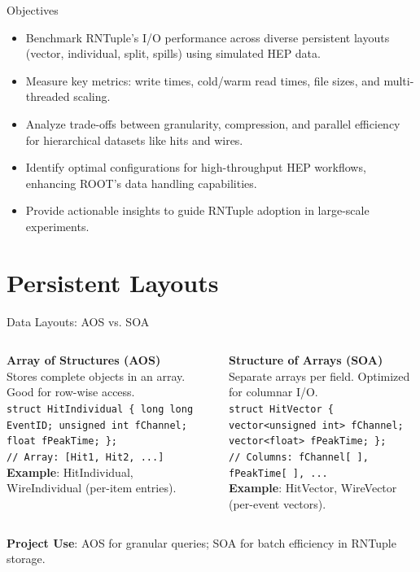 \documentclass[aspectratio=169]{beamer}
\begin{document}
\begin{frame}{Objectives}
  \begin{itemize}
    \item Benchmark RNTuple's I/O performance across diverse persistent layouts (vector, individual, split, spills) using simulated HEP data.
    \item Measure key metrics: write times, cold/warm read times, file sizes, and multi-threaded scaling.
    \item Analyze trade-offs between granularity, compression, and parallel efficiency for hierarchical datasets like hits and wires.
    \item Identify optimal configurations for high-throughput HEP workflows, enhancing ROOT's data handling capabilities.
    \item Provide actionable insights to guide RNTuple adoption in large-scale experiments.
  \end{itemize}
\end{frame}

\section{Persistent Layouts}
\begin{frame}{Data Layouts: AOS vs. SOA}
  \begin{columns}
    \textbf{Array of Structures (AOS)} \\
    \small Stores complete objects in an array. Good for row-wise access.
    \vspace{0.5em}\\
    \texttt{struct HitIndividual \{ long long EventID; unsigned int fChannel; float fPeakTime; \};} \\
    \texttt{// Array: [Hit1, Hit2, ...]}
    \vspace{0.5em}\\
    \textbf{Example}: HitIndividual, WireIndividual (per-item entries).

    \textbf{Structure of Arrays (SOA)} \\
    \small Separate arrays per field. Optimized for columnar I/O.
    \vspace{0.5em}\\
    \texttt{struct HitVector \{ vector<unsigned int> fChannel; vector<float> fPeakTime; \};} \\
    \texttt{// Columns: fChannel[ ], fPeakTime[ ], ...}
    \vspace{0.5em}\\
    \textbf{Example}: HitVector, WireVector (per-event vectors).
  \end{columns}
  \vspace{1em}
  \textbf{Project Use}: AOS for granular queries; SOA for batch efficiency in RNTuple storage.
\end{frame}
\end{document}
